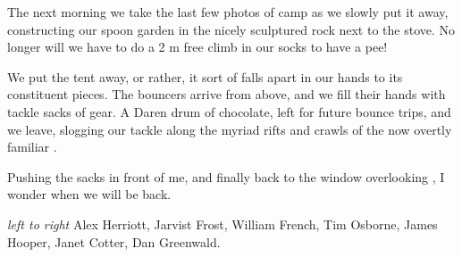 The next morning we take the last few photos of camp as we slowly put it
away, constructing our spoon garden in the nicely sculptured rock next
to the stove. No longer will we have to do a 2 m free climb in our socks
to have a pee!

We put the tent away, or rather, it sort of falls apart in our hands to
its constituent pieces. The bouncers arrive from above, and we fill
their hands with tackle sacks of gear. A Daren drum of chocolate, left
for future bounce trips, and we leave, slogging our tackle along the
myriad rifts and crawls of the now overtly familiar .

Pushing the sacks in front of me, and finally back to the  window overlooking , I wonder when we will be back.





\begin{pagefigure}
\checkoddpage \ifoddpage \forcerectofloat \else \forceversofloat \fi
{}
\caption{\textit{left to right} Alex Herriott, Jarvist Frost, William French, Tim Osborne, James Hooper, Janet Cotter, Dan Greenwald. } \label{expo 2009}
\end{pagefigure}